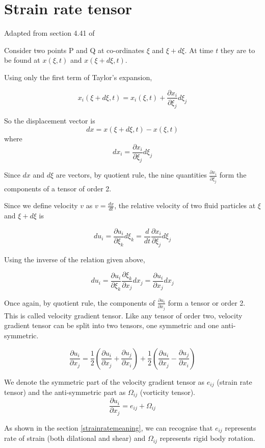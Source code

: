 
\section{Strain rate tensor}

\label{strainratetensor}

Adapted from section 4.41 of \cite{aris}

Consider two points P and Q at co-ordinates $\xi$ and $\xi+d \xi$. At time $t$ they are to be found at $x(\xi,t)$ and $x(\xi+d\xi,t)$.

Using only the first term of Taylor's expansion,

$$ x_i(\xi + d\xi, t) = x_i(\xi,t) + \frac{\partial x_i}{\partial \xi_j} d\xi_j $$

So the displacement vector is
$$ dx = x(\xi+d\xi,t) - x(\xi,t) $$
where
$$ dx_i = \frac{\partial x_i}{\partial \xi_j} d\xi_j $$

Since $dx$ and $d\xi$ are vectors, by quotient rule, the nine quantities $\frac{\partial x_i}{\partial \xi_j}$ form the components of a tensor of order 2.

Since we define velocity $v$ as $v=\frac{dx}{dt}$, the relative velocity of two fluid particles at $\xi$ and $\xi+d\xi$ is

$$ du_i = \frac{\partial u_i}{\partial \xi_k} d\xi_k = \frac{d}{dt} \frac{\partial x_i}{\partial \xi_j} d \xi_j $$

Using the inverse of the relation given above,

$$ du_i = \frac{\partial u_i}{\partial \xi_k} \frac{\partial \xi_k}{\partial x_j} dx_j = \frac{\partial u_i}{\partial x_j} dx_j $$

Once again, by quotient rule, the components of $\frac{\partial u_i}{\partial x_j}$ form a tensor or order 2. This is called velocity gradient tensor. Like any tensor of order two, velocity gradient tensor can be split into two tensors, one symmetric and one anti-symmetric.

$$ \frac{\partial u_i}{\partial x_j} = \frac{1}{2} \left( \frac{\partial u_i}{\partial x_j} + \frac{\partial u_j}{\partial x_i} \right) + \frac{1}{2} \left( \frac{\partial u_i}{\partial x_j} - \frac{\partial u_j}{\partial x_i} \right) $$

We denote the symmetric part of the velocity gradient tensor as $e_{ij}$ (strain rate tensor) and the anti-symmetric part as $\Omega_{ij}$ (vorticity tensor).
$$ \frac{\partial u_i}{\partial x_j} = e_{ij} + \Omega_{ij} $$

As shown in the section \ref{strainratemeaning}, we can recognise that $e_{ij}$ represents rate of strain (both dilational and shear) and $\Omega_{ij}$ represents rigid body rotation.


